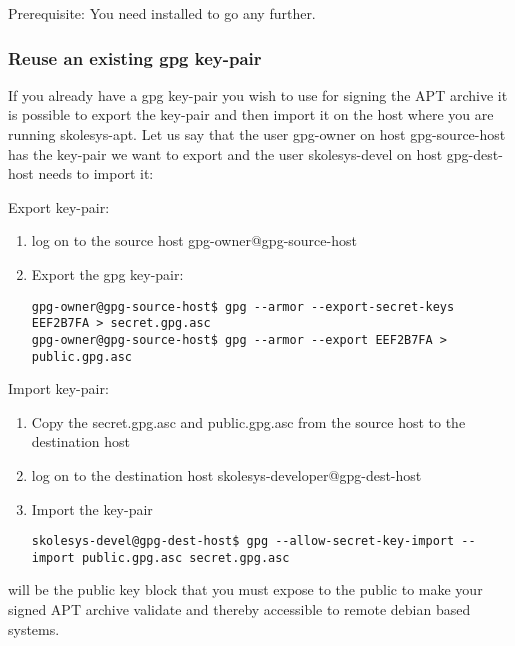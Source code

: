 Prerequisite: You need  installed to go any further.

\subsubsection{Reuse an existing gpg key-pair\label{skolesys-apt-reusegpg}}
If you already have a gpg key-pair you wish to use for signing the APT archive it is possible to export the key-pair and then import it on the host where you are running skolesys-apt.
Let us say that the user gpg-owner on host gpg-source-host has the key-pair we want to export and the user skolesys-devel on host gpg-dest-host needs to import it:

Export key-pair:
\begin{enumerate}
 \item log on to the source host gpg-owner@gpg-source-host
 \item Export the gpg key-pair:
\begin{verbatim}
gpg-owner@gpg-source-host$ gpg --armor --export-secret-keys EEF2B7FA > secret.gpg.asc
gpg-owner@gpg-source-host$ gpg --armor --export EEF2B7FA > public.gpg.asc
\end{verbatim}
\end{enumerate}

Import key-pair:

\begin{enumerate}
 \item Copy the secret.gpg.asc and public.gpg.asc from the source host to the destination host
 \item log on to the destination host skolesys-developer@gpg-dest-host
 \item Import the key-pair
\begin{verbatim}
skolesys-devel@gpg-dest-host$ gpg --allow-secret-key-import --import public.gpg.asc secret.gpg.asc
\end{verbatim}
\end{enumerate}

 will be the public key block that you must expose to the public to make your signed APT archive validate and thereby accessible to remote debian based systems.


